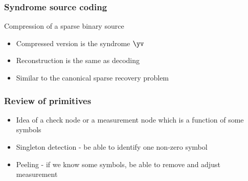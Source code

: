 \begin{frame} \frametitle{Syndrome source coding}

\resizebox{4.0in}{!}{}

\begin{block}{Compression of a sparse binary source}
\begin{itemize}
\item Compressed version is the syndrome $\yv$
\item Reconstruction is the same as decoding
\item Similar to the canonical sparse recovery problem
\end{itemize}
\end{block}
\end{frame}
\begin{frame}\frametitle{Review of primitives}
\begin{itemize}
\item Idea of a check node or a measurement node which is a function of some symbols
\item Singleton detection - be able to identify one non-zero symbol
\item Peeling - if we know some symbols, be able to remove and adjust measurement
\end{itemize}
\end{frame}
